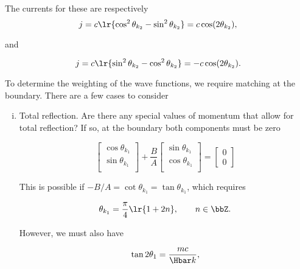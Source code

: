 The currents for these are respectively
\begin{dmath}\label{eqn:gradQuantumProblemSet4Problem3:1321}
j = c \lr{ \cos^2\theta_{k_2} - \sin^2\theta_{k_2} } = c \cos(2\theta_{k_2}),
\end{dmath}

and

\begin{dmath}\label{eqn:gradQuantumProblemSet4Problem3:1341}
j = c \lr{ \sin^2\theta_{k_2} - \cos^2\theta_{k_2} } = -c \cos(2\theta_{k_2}).
\end{dmath}

To determine the weighting of the wave functions, we require matching at the boundary.  There are a few cases to consider

\begin{enumerate}[(i)]
\item Total reflection.  Are there any special values of momentum that allow for total reflection?  If so, at the boundary both components must be zero

\begin{dmath}\label{eqn:gradQuantumProblemSet4Problem3:720}
\begin{bmatrix}
\cos\theta_{k_1} \\
\sin\theta_{k_1} \\
\end{bmatrix}
+
\frac{B}{A}
\begin{bmatrix}
\sin\theta_{k_1} \\
\cos\theta_{k_1} \\
\end{bmatrix}
=
\begin{bmatrix}
0 \\
0
\end{bmatrix}
\end{dmath}

This is possible if \( -B/A = \cot\theta_{k_1} = \tan\theta_{k_1} \), which requires

\begin{equation}\label{eqn:gradQuantumProblemSet4Problem3:740}
\theta_{k_1} = \frac{\pi}{4} \lr{ 1 + 2 n }, \qquad n \in \bbZ.
\end{equation}

However, we must also have

\begin{dmath}\label{eqn:gradQuantumProblemSet4Problem3:760}
\tan 2 \theta_1 = \frac{m c}{\Hbar k},
\end{dmath}


\end{enumerate}
